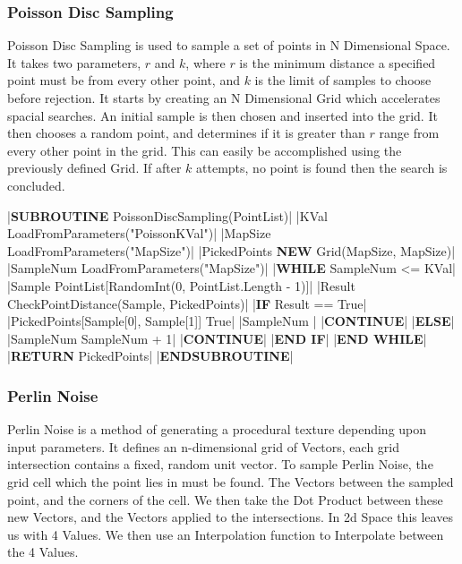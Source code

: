 \begin{flushleft}
                \vspace{0.5cm}
            \subsubsection{Poisson Disc Sampling}
                Poisson Disc Sampling is used to sample a set of points in N Dimensional Space. It takes two parameters, $r$ and $k$, where
                $r$ is the minimum distance a specified point must be from every other point, and $k$ is the limit of samples to choose
                before rejection. It starts by creating an N Dimensional Grid which accelerates spacial searches. An initial sample is then
                chosen and inserted into the grid. It then chooses a random point, and determines if it is greater than $r$ range from every 
                other point in the grid. This can easily be accomplished using the previously defined Grid. If after $k$ attempts, no point is
                found then the search is concluded.

                \vspace{0.2cm}
                \begin{pseudocode}
|\textbf{SUBROUTINE} PoissonDiscSampling(PointList)|
    |KVal \leftarrow LoadFromParameters("PoissonKVal")|
    |MapSize \leftarrow LoadFromParameters("MapSize")|
    |PickedPoints \leftarrow \textbf{NEW} Grid(MapSize, MapSize)|
    |SampleNum \leftarrow LoadFromParameters("MapSize")|
    |\textbf{WHILE} SampleNum <= KVal|
        |Sample \leftarrow PointList[RandomInt(0, PointList.Length - 1)]|
        |Result \leftarrow CheckPointDistance(Sample, PickedPoints)|
        |\textbf{IF} Result == True|
            |PickedPoints[Sample[0], Sample[1]] \leftarrow True|
            |SampleNum |
            |\textbf{CONTINUE}|
        |\textbf{ELSE}|
            |SampleNum \leftarrow SampleNum + 1|
            |\textbf{CONTINUE}|
        |\textbf{END IF}|
    |\textbf{END WHILE}|
    |\textbf{RETURN} PickedPoints|
|\textbf{ENDSUBROUTINE}|
                \end{pseudocode}
                
                \vspace{0.5cm}
            \subsubsection{Perlin Noise}
                Perlin Noise is a method of generating a procedural texture depending upon input parameters. It defines an n-dimensional
                grid of Vectors, each grid intersection contains a fixed, random unit vector. To sample Perlin Noise, the grid cell which
                the point lies in must be found. The Vectors between the sampled point, and the corners of the cell. We then take the Dot
                Product between these new Vectors, and the Vectors applied to the intersections. In 2d Space this leaves us with 4 Values.
                We then use an Interpolation function to Interpolate between the 4 Values. 
            

\end{flushleft}
